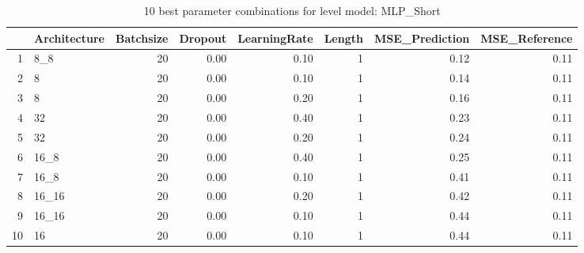 \begin{table}[ht]
\centering
\begin{tabular}{rlrrrrrr}
  \hline
 & Architecture & Batchsize & Dropout & LearningRate & Length & MSE\_Prediction & MSE\_Reference \\ 
  \hline
1 & 8\_8 &  20 & 0.00 & 0.10 &   1 & 0.12 & 0.11 \\ 
  2 & 8 &  20 & 0.00 & 0.10 &   1 & 0.14 & 0.11 \\ 
  3 & 8 &  20 & 0.00 & 0.20 &   1 & 0.16 & 0.11 \\ 
  4 & 32 &  20 & 0.00 & 0.40 &   1 & 0.23 & 0.11 \\ 
  5 & 32 &  20 & 0.00 & 0.20 &   1 & 0.24 & 0.11 \\ 
  6 & 16\_8 &  20 & 0.00 & 0.40 &   1 & 0.25 & 0.11 \\ 
  7 & 16\_8 &  20 & 0.00 & 0.10 &   1 & 0.41 & 0.11 \\ 
  8 & 16\_16 &  20 & 0.00 & 0.20 &   1 & 0.42 & 0.11 \\ 
  9 & 16\_16 &  20 & 0.00 & 0.10 &   1 & 0.44 & 0.11 \\ 
  10 & 16 &  20 & 0.00 & 0.10 &   1 & 0.44 & 0.11 \\ 
   \hline
\end{tabular}
\caption{10 best parameter combinations for level model: MLP_Short} 
\label{tab:MLP_Short_top_10}
\end{table}
